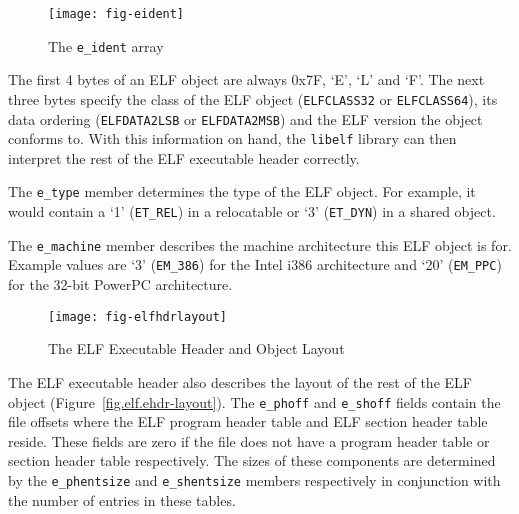 \documentclass[a4paper,pdftex]{book}
\makeatletter
\newcommand{\constant}[1]{\texttt{#1}}
\newcommand{\library}[1]{\texttt{#1}}
\newcommand{\parameter}[1]{\texttt{#1}}
\newcommand{\reg}{\textregistered\xspace}
\newcommand{\trade}{\texttrademark\xspace}
\newenvironment{callout}[2][black]{%
  \begingroup\newcommand{\@cocolor}{#1}%
  \setlength{\shadowsize}{1.2pt}%
  \newcommand{\@cogroup}[1]{#2}}{\endgroup}
\newcommand{\@co}[1]{\shadowbox{\color{\@cocolor}#1}}
\newcommand{\coref}[1]{%
  \hypertarget{\@cogroup.#1.cr}{%
    \hyperlink{\@cogroup.#1.co}{\@co{#1}}}}
\makeatother
\begin{document}
\begin{callout}{ehdr}
\begin{description}
    \begin{figure}[H]
      \caption{The \parameter{e\_ident} array}\label{fig.elf.eident}
      \index{executable~header!e_ident@\parameter{e\_ident} field}
      \begin{center}
        \texttt{[image: fig-eident]}
      \end{center}
    \end{figure}

    The first 4 bytes of an ELF object are always 0x7F, `E', `L' and
    `F'.  The next three bytes specify the class of the ELF object
    (\constant{ELFCLASS32} or \constant{ELFCLASS64}), its data
    ordering (\constant{ELFDATA2LSB} or \constant{ELFDATA2MSB}) and
    the ELF version the object conforms to.  With this information on
    hand, the \library{libelf} library can then interpret the rest of
    the ELF executable header correctly.

  \item[\coref{2}] The \parameter{e\_type} member determines the type
    of the ELF object.  For example, it would contain a `1'
    (\constant{ET\_REL}) in a relocatable or `3' (\constant{ET\_DYN})
    in a shared object.%

  \item[\coref{3}] The \parameter{e\_machine} member describes the
    machine architecture this ELF object is for.  Example values are `3'
    (\constant{EM\_386}) for the Intel\reg i386\trade architecture and
    `20' (\constant{EM\_PPC}) for the 32-bit PowerPC\trade architecture.%

  \begin{figure}
    \caption{The ELF Executable Header and Object Layout}
    \label{fig.elf.ehdr-layout}
    \begin{center}
      \texttt{[image: fig-elfhdrlayout]}
    \end{center}
  \end{figure}

  \item[\coref{4} \coref{5}] The ELF executable header also describes
    the layout of the rest of the ELF object
    (Figure~\vref{fig.elf.ehdr-layout}). The \parameter{e\_phoff} and
    \parameter{e\_shoff} fields contain the file offsets where the ELF
    program header table and ELF section header table reside.
    These fields are zero if the file does not have a program header
    table or section header table respectively.  The sizes of these
    components are determined by the \parameter{e\_phentsize} and
    \parameter{e\_shentsize} members respectively in conjunction with
    the number of entries in these tables.%


\end{description}
\end{callout}
\end{document}
